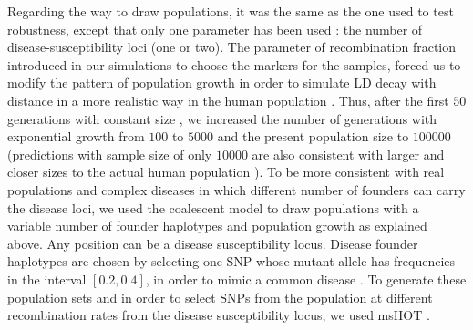 \documentclass[runningheads]{llncs}
\begin{document}
Regarding the way to draw populations, it was the same as the one used to test robustness, except that only one parameter has been used \cite{Lam.zz.2000,Zhang.zz.2003,Yu.zz.2005}: the number of disease-susceptibility loci (one or two). The parameter of recombination fraction introduced in our simulations to choose the markers for the samples, forced us to modify the pattern of population growth in order  to simulate LD decay with distance in a more realistic way in the human population \cite{Kruglyak.99,Crawford.zz.2004}. Thus, after the first $50$ generations with constant size \cite{Lam.zz.2000,Zhang.zz.2003,Yu.zz.2005}, we increased the number of generations with exponential growth from $100$ to $5000$ and the present population size to $100000$ (predictions with sample size of only $10000$ are also consistent with larger and closer sizes to the actual human population \cite{Kruglyak.99}). 
To be more consistent with real populations and complex diseases in which different number of founders can carry the disease loci, we used the coalescent model \cite{Nordborg.2001} to draw populations with a variable number of founder haplotypes and population growth as explained above.
Any position can be a disease susceptibility locus. Disease founder haplotypes are chosen by selecting one SNP whose mutant allele has frequencies in the interval $[0.2, 0.4]$, in order to mimic a common disease \cite{Yu.zz.2005}. To generate these population sets and in order to select SNPs from the population at different recombination rates from the disease susceptibility locus, we used msHOT \cite{Hellenthal.Stephens.2007}.    
\end{document}
